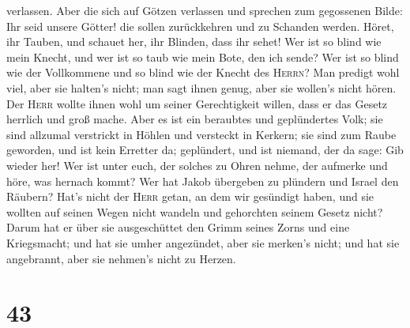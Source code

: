 verlassen.  Aber die sich auf Götzen verlassen und
sprechen zum gegossenen Bilde: Ihr seid unsere Götter! die sollen
zurückkehren und zu Schanden werden.  Höret, ihr Tauben,
und schauet her, ihr Blinden, dass ihr sehet!  Wer ist so
blind wie mein Knecht, und wer ist so taub wie mein Bote, den ich sende?
Wer ist so blind wie der Vollkommene und so blind wie der Knecht des
\textsc{Herrn}?  Man predigt wohl viel, aber sie halten's
nicht; man sagt ihnen genug, aber sie wollen's nicht hören.
 Der \textsc{Herr} wollte ihnen wohl um seiner
Gerechtigkeit willen, dass er das Gesetz herrlich und groß mache.
 Aber es ist ein beraubtes und geplündertes Volk; sie
sind allzumal verstrickt in Höhlen und versteckt in Kerkern; sie sind
zum Raube geworden, und ist kein Erretter da; geplündert, und ist
niemand, der da sage: Gib wieder her!  Wer ist unter
euch, der solches zu Ohren nehme, der aufmerke und höre, was hernach
kommt?  Wer hat Jakob übergeben zu plündern und Israel
den Räubern? Hat's nicht der \textsc{Herr} getan, an dem wir gesündigt
haben, und sie wollten auf seinen Wegen nicht wandeln und gehorchten
seinem Gesetz nicht?  Darum hat er über sie ausgeschüttet
den Grimm seines Zorns und eine Kriegsmacht; und hat sie umher
angezündet, aber sie merken's nicht; und hat sie angebrannt, aber sie
nehmen's nicht zu Herzen.

\hypertarget{section-42}{%
\section{43}\label{section-42}}

